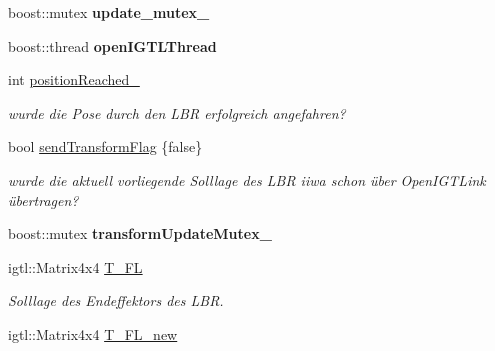 \begin{DoxyCompactItemize}
\item 
\hypertarget{classRosOpenIgtlBridge_ac28588689dc275b6b06efa56e9bfbcc3}{boost\-::mutex {\bfseries update\-\_\-mutex\-\_\-}}\label{classRosOpenIgtlBridge_ac28588689dc275b6b06efa56e9bfbcc3}

\item 
\hypertarget{classRosOpenIgtlBridge_ab7c09ef893ace60f12429b6df7d295e6}{boost\-::thread {\bfseries open\-I\-G\-T\-L\-Thread}}\label{classRosOpenIgtlBridge_ab7c09ef893ace60f12429b6df7d295e6}

\item 
\hypertarget{classRosOpenIgtlBridge_a1a2f941f4f0fcb4fee19f01acc3ff32b}{int \hyperlink{classRosOpenIgtlBridge_a1a2f941f4f0fcb4fee19f01acc3ff32b}{position\-Reached\-\_\-}}\label{classRosOpenIgtlBridge_a1a2f941f4f0fcb4fee19f01acc3ff32b}

\begin{DoxyCompactList}\small\item\em wurde die Pose durch den L\-B\-R erfolgreich angefahren? \end{DoxyCompactList}\item 
\hypertarget{classRosOpenIgtlBridge_a1b105e3199f1f2faf21b2479c4518db1}{bool \hyperlink{classRosOpenIgtlBridge_a1b105e3199f1f2faf21b2479c4518db1}{send\-Transform\-Flag} \{false\}}\label{classRosOpenIgtlBridge_a1b105e3199f1f2faf21b2479c4518db1}

\begin{DoxyCompactList}\small\item\em wurde die aktuell vorliegende Solllage des L\-B\-R iiwa schon über Open\-I\-G\-T\-Link übertragen? \end{DoxyCompactList}\item 
\hypertarget{classRosOpenIgtlBridge_a0517326bc17e781461b2a1391298f620}{boost\-::mutex {\bfseries transform\-Update\-Mutex\-\_\-}}\label{classRosOpenIgtlBridge_a0517326bc17e781461b2a1391298f620}

\item 
\hypertarget{classRosOpenIgtlBridge_a8dbc016aacf3ff2caad058ec50a96e77}{igtl\-::\-Matrix4x4 \hyperlink{classRosOpenIgtlBridge_a8dbc016aacf3ff2caad058ec50a96e77}{T\-\_\-\-F\-L}}\label{classRosOpenIgtlBridge_a8dbc016aacf3ff2caad058ec50a96e77}

\begin{DoxyCompactList}\small\item\em Solllage des Endeffektors des L\-B\-R. \end{DoxyCompactList}\item 
\hypertarget{classRosOpenIgtlBridge_ace49281b853f92fbd9decbaa2dcd5b70}{igtl\-::\-Matrix4x4 \hyperlink{classRosOpenIgtlBridge_ace49281b853f92fbd9decbaa2dcd5b70}{T\-\_\-\-F\-L\-\_\-new}}\label{classRosOpenIgtlBridge_ace49281b853f92fbd9decbaa2dcd5b70}


\end{DoxyCompactItemize}
